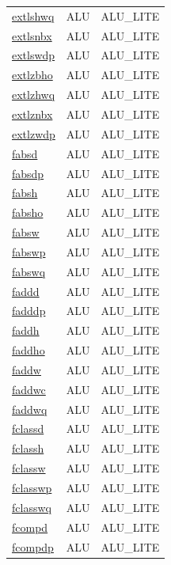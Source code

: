 \begin{small}
\begin{longtable}[l]{l l l}
\hyperlink{lvx.extlshwq}{extlshwq} & ALU & ALU\_LITE \\ 
\hyperlink{lvx.extlsnbx}{extlsnbx} & ALU & ALU\_LITE \\ 
\hyperlink{lvx.extlswdp}{extlswdp} & ALU & ALU\_LITE \\ 
\hyperlink{lvx.extlzbho}{extlzbho} & ALU & ALU\_LITE \\ 
\hyperlink{lvx.extlzhwq}{extlzhwq} & ALU & ALU\_LITE \\ 
\hyperlink{lvx.extlznbx}{extlznbx} & ALU & ALU\_LITE \\ 
\hyperlink{lvx.extlzwdp}{extlzwdp} & ALU & ALU\_LITE \\ 
\hyperlink{lvx.fabsd}{fabsd} & ALU & ALU\_LITE \\ 
\hyperlink{lvx.fabsdp}{fabsdp} & ALU & ALU\_LITE \\ 
\hyperlink{lvx.fabsh}{fabsh} & ALU & ALU\_LITE \\ 
\hyperlink{lvx.fabsho}{fabsho} & ALU & ALU\_LITE \\ 
\hyperlink{lvx.fabsw}{fabsw} & ALU & ALU\_LITE \\ 
\hyperlink{lvx.fabswp}{fabswp} & ALU & ALU\_LITE \\ 
\hyperlink{lvx.fabswq}{fabswq} & ALU & ALU\_LITE \\ 
\hyperlink{lvx.faddd}{faddd} & ALU & ALU\_LITE \\ 
\hyperlink{lvx.fadddp}{fadddp} & ALU & ALU\_LITE \\ 
\hyperlink{lvx.faddh}{faddh} & ALU & ALU\_LITE \\ 
\hyperlink{lvx.faddho}{faddho} & ALU & ALU\_LITE \\ 
\hyperlink{lvx.faddw}{faddw} & ALU & ALU\_LITE \\ 
\hyperlink{lvx.faddwc}{faddwc} & ALU & ALU\_LITE \\ 
\hyperlink{lvx.faddwq}{faddwq} & ALU & ALU\_LITE \\ 
\hyperlink{lvx.fclassd}{fclassd} & ALU & ALU\_LITE \\ 
\hyperlink{lvx.fclassh}{fclassh} & ALU & ALU\_LITE \\ 
\hyperlink{lvx.fclassw}{fclassw} & ALU & ALU\_LITE \\ 
\hyperlink{lvx.fclasswp}{fclasswp} & ALU & ALU\_LITE \\ 
\hyperlink{lvx.fclasswq}{fclasswq} & ALU & ALU\_LITE \\ 
\hyperlink{lvx.fcompd}{fcompd} & ALU & ALU\_LITE \\ 
\hyperlink{lvx.fcompdp}{fcompdp} & ALU & ALU\_LITE \\ 

\end{longtable}
\end{small}
